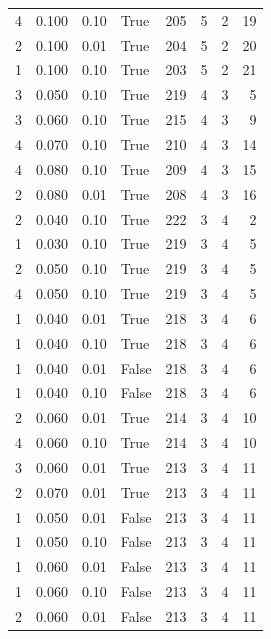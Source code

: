 \documentclass[a4paper,twoside,12pt]{book}
\begin{document}
\begin{table}
\begin{tabular}{rrrlrrrr}
				4 &  0.100 &     0.10 &     True &  205 &  5 &   2 &  19 \\
				2 &  0.100 &     0.01 &     True &  204 &  5 &   2 &  20 \\
				1 &  0.100 &     0.10 &     True &  203 &  5 &   2 &  21 \\
				3 &  0.050 &     0.10 &     True &  219 &  4 &   3 &   5 \\
				3 &  0.060 &     0.10 &     True &  215 &  4 &   3 &   9 \\
				4 &  0.070 &     0.10 &     True &  210 &  4 &   3 &  14 \\
				4 &  0.080 &     0.10 &     True &  209 &  4 &   3 &  15 \\
				2 &  0.080 &     0.01 &     True &  208 &  4 &   3 &  16 \\
				2 &  0.040 &     0.10 &     True &  222 &  3 &   4 &   2 \\
				1 &  0.030 &     0.10 &     True &  219 &  3 &   4 &   5 \\
				2 &  0.050 &     0.10 &     True &  219 &  3 &   4 &   5 \\
				4 &  0.050 &     0.10 &     True &  219 &  3 &   4 &   5 \\
				1 &  0.040 &     0.01 &     True &  218 &  3 &   4 &   6 \\
				1 &  0.040 &     0.10 &     True &  218 &  3 &   4 &   6 \\
				1 &  0.040 &     0.01 &    False &  218 &  3 &   4 &   6 \\
				1 &  0.040 &     0.10 &    False &  218 &  3 &   4 &   6 \\
				2 &  0.060 &     0.01 &     True &  214 &  3 &   4 &  10 \\
				4 &  0.060 &     0.10 &     True &  214 &  3 &   4 &  10 \\
				3 &  0.060 &     0.01 &     True &  213 &  3 &   4 &  11 \\
				2 &  0.070 &     0.01 &     True &  213 &  3 &   4 &  11 \\
				1 &  0.050 &     0.01 &    False &  213 &  3 &   4 &  11 \\
				1 &  0.050 &     0.10 &    False &  213 &  3 &   4 &  11 \\
				1 &  0.060 &     0.01 &    False &  213 &  3 &   4 &  11 \\
				1 &  0.060 &     0.10 &    False &  213 &  3 &   4 &  11 \\
				2 &  0.060 &     0.01 &    False &  213 &  3 &   4 &  11 \\

\end{tabular}
\end{table}
\end{document}
